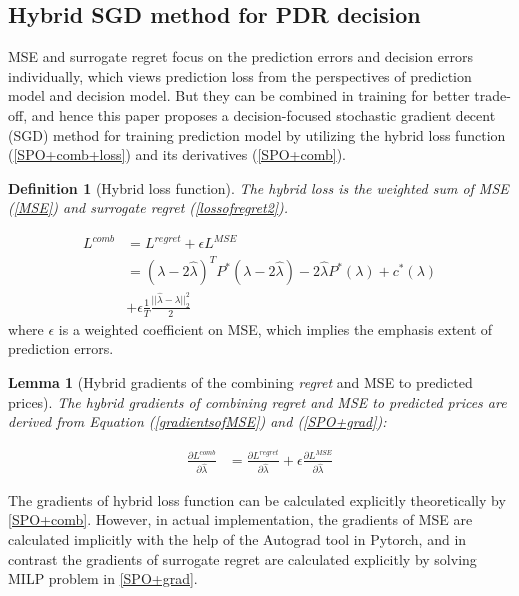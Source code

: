 \documentclass[journal]{IEEEtran}
\newtheorem{definition}{Definition}
\newtheorem{lemma}{Lemma}
\begin{document}
\subsection{Hybrid SGD method for PDR decision}
MSE and surrogate regret focus on the prediction errors and decision errors individually, which views prediction loss from the perspectives of prediction model and decision model. But they can be combined in training for better trade-off, and hence this paper proposes a decision-focused stochastic gradient decent (SGD) method for training prediction model by utilizing the hybrid loss function (\ref{SPO+comb+loss}) and its derivatives (\ref{SPO+comb}).

\begin{definition}[Hybrid loss function]
  The hybrid loss is the weighted sum of MSE (\ref{MSE}) and surrogate \textit{regret} (\ref{lossofregret2}).
\end{definition}

\begin{equation}
  \label{SPO+comb+loss}
  \begin{aligned}
    L^{comb} &= L^{regret} +\epsilon L^{MSE} \\
    &= (\lambda - 2 \hat{\lambda})^T P^*(\lambda - 2 \hat{\lambda}) - 2 \hat{\lambda} P^*(\lambda) + c^*(\lambda) \\
    &+ \epsilon \frac{1}{T} \frac{||\hat{\lambda} - \lambda ||^2_2}{2}
  \end{aligned}
\end{equation}
where $\epsilon$ is a weighted coefficient on MSE, which implies the emphasis extent of prediction errors.

\begin{lemma}[Hybrid gradients of the combining \textit{regret} and MSE to predicted prices]
  The hybrid gradients of combining \textit{regret} and MSE to predicted prices are derived from Equation (\ref{gradientsofMSE}) and (\ref{SPO+grad}):
\end{lemma}

\begin{equation}
  \label{SPO+comb}
  \begin{aligned}
    \frac{\partial L^{comb}}{\partial \hat{\lambda}} & = \frac{\partial L^{regret}}{\partial \hat{\lambda}}+\epsilon \frac{\partial L^{MSE}}{\partial \hat{\lambda}}
  \end{aligned}
\end{equation}

The gradients of hybrid loss function can be calculated explicitly theoretically by \ref{SPO+comb}. However, in actual implementation, the gradients of MSE are calculated implicitly with the help of the Autograd tool \cite{Paszke2019} in Pytorch, and in contrast the gradients of surrogate regret are calculated explicitly by solving MILP problem in \ref{SPO+grad}. 
\end{document}
